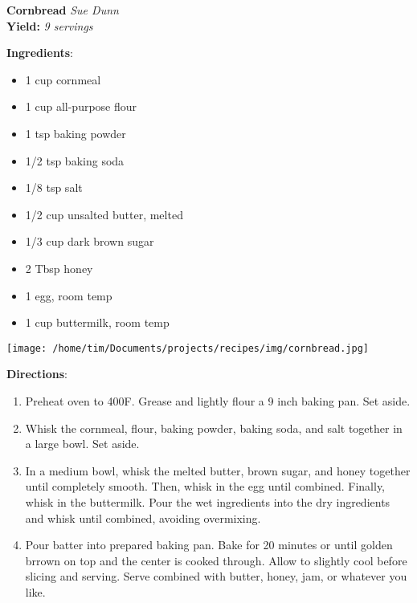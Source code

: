 \documentclass[11pt, twoside, openany]{book}
\begin{document}
\noindent\begin{minipage}[t]{\linewidth}%
{\Large\textbf{Cornbread}} \label{cornbread}\hfill\textit{Sue Dunn}\\
\textbf{Yield:} \textit{9 servings}\\
\noindent\begin{minipage}[t]{0.78\linewidth}%
\textbf{Ingredients}:\vspace{-3mm}
\begin{multicols}{2}
\begin{itemize}\setlength\itemsep{-1mm}
\item 1 cup cornmeal
\item 1 cup all-purpose flour
\item 1 tsp baking powder
\item 1/2 tsp baking soda
\item 1/8 tsp salt
\item 1/2 cup unsalted butter, melted
\item 1/3 cup dark brown sugar
\item 2 Tbsp honey
\item 1 egg, room temp
\item 1 cup buttermilk, room temp
\end{itemize}
\end{multicols}
\end{minipage}
\noindent\begin{minipage}[t]{0.18\linewidth}
\centering \strut\vspace*{-\baselineskip}\newline
\texttt{[image: /home/tim/Documents/projects/recipes/img/cornbread.jpg]}\\
\end{minipage}\vspace{3mm}
\textbf{Directions}:
\vspace{-3mm}\begin{enumerate}\setlength\itemsep{-1mm}
\item Preheat oven to 400F. Grease and lightly flour a 9 inch baking pan. Set aside.
\item Whisk the cornmeal, flour, baking powder, baking soda, and salt together in a large bowl. Set aside.
\item In a medium bowl, whisk the melted butter, brown sugar, and honey together until completely smooth. Then, whisk in the egg until combined. Finally, whisk in the buttermilk. Pour the wet ingredients into the dry ingredients and whisk until combined, avoiding overmixing.
\item Pour batter into prepared baking pan. Bake for 20 minutes or until golden brrown on top and the center is cooked through. Allow to slightly cool before slicing and serving. Serve combined with butter, honey, jam, or whatever you like.
\end{enumerate}
\end{minipage}\vspace{8mm}
\end{document}
